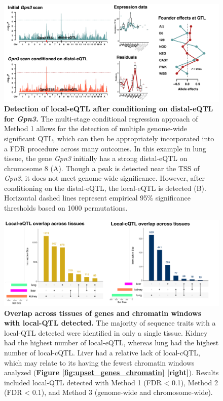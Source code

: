 \documentclass[9pt,twocolumn,twoside]{gsajnl}
\begin{document}
\begin{figure}[hp]
\renewcommand{\familydefault}{\sfdefault}\normalfont
\centering
\includegraphics[width=\textwidth, trim={0in 0in 0in 0in}, clip]{figs/gpn3_conditional_scan.pdf}
\caption{\textbf{Detection of local-eQTL after conditioning on distal-eQTL for \textit{Gpn3}.} The multi-stage conditional regression approach of Method 1 allows for the detection of multiple genome-wide significant QTL, which can then be appropriately incorporated into a FDR procedure across many outcomes. In this example in lung tissue, the gene \textit{Gpn3} initially has a strong distal-eQTL on chromosome 8 (A). Though a peak is detected near the TSS of \textit{Gpn3}, it does not meet genome-wide significance. However, after conditioning on the distal-eQTL, the local-eQTL is detected (B). Horizontal dashed lines represent empirical 95\% significance thresholds based on 1000 permutations.
\label{fig:conditional_scans}}
\end{figure}

\begin{figure}[hp]
\renewcommand{\familydefault}{\sfdefault}\normalfont
\centering
\includegraphics[width=\textwidth, trim={0in 0in 0in 0in}, clip]{figs/upset_eqtl_cqtl.pdf}
\caption{\textbf{Overlap across tissues of genes and chromatin windows with local-QTL detected.} The majority of sequence traits with a local-QTL detected were identified in only a single tissue. Kidney had the highest number of local-eQTL, whereas lung had the highest number of local-cQTL. Liver had a relative lack of local-cQTL, which may relate to its having the fewest chromatin windows analyzed (\textbf{Figure \ref{fig:upset_genes_chromatin} [right]}). Results included local-QTL detected with Method 1 (FDR < 0.1), Method 2 (FDR < 0.1), and Method 3 (genome-wide and chromosome-wide). 
\label{fig:upset_eqtl_cqtl}}
\end{figure}
\end{document}
